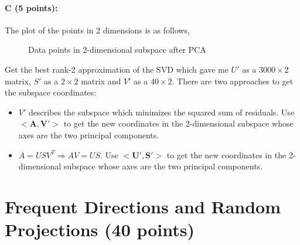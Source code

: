 \documentclass[11pt]{article}
\begin{document}
\paragraph{C (5 points):}
The plot of the points in 2 dimensions is as follows,
\begin{figure}[H]
\caption{Data points in 2-dimensional subspace after PCA}
\label{fig:name}
\end{figure}
Get the best rank-2 approximation of the SVD which gave me $U'$ as a $3000\times2$ matrix, $S'$ as a $2\times2$ matrix and $V'$ as a $40\times2$. There are two approaches to get the subspace coordinates:
\begin{itemize}
\item $V'$ describes the subspace which minimizes the squared sum of residuals. Use $\mathbf{<A,V'>}$ to get the new coordinates in the 2-dimensional subspace whose axes are the two principal components.
\item $A = USV^T \Rightarrow AV=US$. Use $\mathbf{<U',S'>}$ to get the new coordinates in the 2-dimensional subspace whose axes are the two principal components.
\end{itemize}

\section{Frequent Directions and Random Projections (40 points)}
\end{document}
